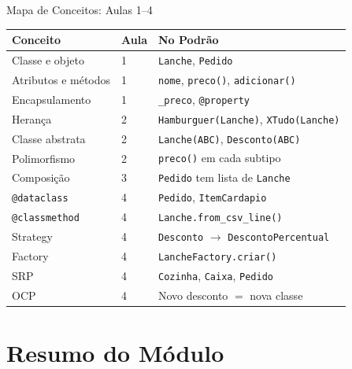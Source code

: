 \documentclass[aspectratio=169]{beamer}
\begin{document}
\begin{frame}{Mapa de Conceitos: Aulas 1--4}
\begin{table}
\centering
\scriptsize
\begin{tabular}{lll}
\toprule
\textbf{Conceito} & \textbf{Aula} & \textbf{No Podrão} \\
\midrule
Classe e objeto          & 1 & \texttt{Lanche}, \texttt{Pedido} \\
Atributos e métodos      & 1 & \texttt{nome}, \texttt{preco()}, \texttt{adicionar()} \\
Encapsulamento           & 1 & \texttt{\_preco}, \texttt{@property} \\
Herança                  & 2 & \texttt{Hamburguer(Lanche)}, \texttt{XTudo(Lanche)} \\
Classe abstrata          & 2 & \texttt{Lanche(ABC)}, \texttt{Desconto(ABC)} \\
Polimorfismo             & 2 & \texttt{preco()} em cada subtipo \\
Composição               & 3 & \texttt{Pedido} tem lista de \texttt{Lanche} \\
\texttt{@dataclass}      & 4 & \texttt{Pedido}, \texttt{ItemCardapio} \\
\texttt{@classmethod}    & 4 & \texttt{Lanche.from\_csv\_line()} \\
Strategy                 & 4 & \texttt{Desconto} $\to$ \texttt{DescontoPercentual} \\
Factory                  & 4 & \texttt{LancheFactory.criar()} \\
SRP                      & 4 & \texttt{Cozinha}, \texttt{Caixa}, \texttt{Pedido} \\
OCP                      & 4 & Novo desconto $=$ nova classe \\
\bottomrule
\end{tabular}
\end{table}
\end{frame}

\section{Resumo do Módulo}
\end{document}
